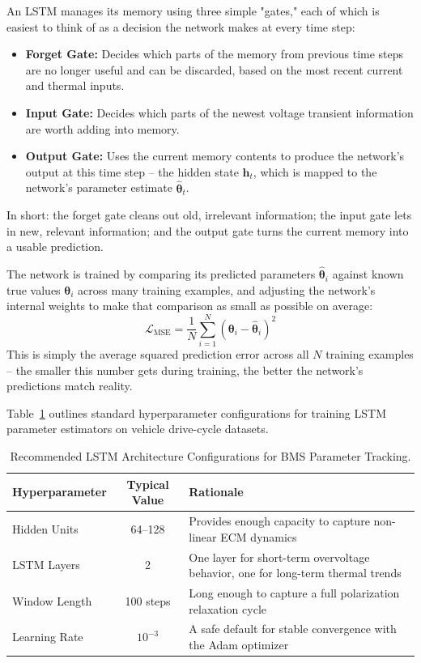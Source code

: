 An LSTM manages its memory using three simple "gates," each of which is easiest to think of as a decision the network makes at every time step:
\begin{itemize}
    \item \textbf{Forget Gate:} Decides which parts of the memory from previous time steps are no longer useful and can be discarded, based on the most recent current and thermal inputs.
    \item \textbf{Input Gate:} Decides which parts of the newest voltage transient information are worth adding into memory.
    \item \textbf{Output Gate:} Uses the current memory contents to produce the network's output at this time step -- the hidden state $\mathbf{h}_t$, which is mapped to the network's parameter estimate $\hat{\boldsymbol{\theta}}_t$.
\end{itemize}
In short: the forget gate cleans out old, irrelevant information; the input gate lets in new, relevant information; and the output gate turns the current memory into a usable prediction.

The network is trained by comparing its predicted parameters $\hat{\boldsymbol{\theta}}_i$ against known true values $\boldsymbol{\theta}_i$ across many training examples, and adjusting the network's internal weights to make that comparison as small as possible on average:
\begin{equation}
\mathcal{L}_{\text{MSE}} = \frac{1}{N} \sum_{i=1}^N \left( \boldsymbol{\theta}_i - \hat{\boldsymbol{\theta}}_i \right)^2
\label{eq:ch8_lstm_loss}
\end{equation}
This is simply the average squared prediction error across all $N$ training examples -- the smaller this number gets during training, the better the network's predictions match reality.

Table~\ref{tab:ch8_lstm_hyperparams} outlines standard hyperparameter configurations for training LSTM parameter estimators on vehicle drive-cycle datasets.

\begin{table}[htbp]
\centering
\caption{Recommended LSTM Architecture Configurations for BMS Parameter Tracking.}
\label{tab:ch8_lstm_hyperparams}
\renewcommand{\arraystretch}{1.3}
\footnotesize
\begin{tabularx}{\textwidth}{|p{3.0cm}|c|X|}
\hline
\textbf{Hyperparameter} & \textbf{Typical Value} & \textbf{Rationale} \\
\hline
Hidden Units & 64--128 & Provides enough capacity to capture non-linear ECM dynamics \\
\hline
LSTM Layers & 2 & One layer for short-term overvoltage behavior, one for long-term thermal trends \\
\hline
Window Length & 100 steps & Long enough to capture a full polarization relaxation cycle \\
\hline
Learning Rate & $10^{-3}$ & A safe default for stable convergence with the Adam optimizer \\
\hline
\end{tabularx}
\end{table}

